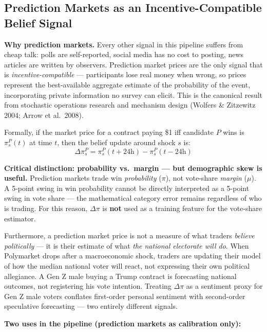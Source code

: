 \documentclass[11pt]{article}
\begin{document}
\subsection*{Prediction Markets as an Incentive-Compatible Belief Signal}

\textbf{Why prediction markets.} Every other signal in this pipeline suffers from
cheap talk: polls are self-reported, social media has no cost to posting, news
articles are written by observers. Prediction market prices are the only signal
that is \emph{incentive-compatible} --- participants lose real money when wrong,
so prices represent the best-available aggregate estimate of the probability of
the event, incorporating private information no survey can elicit. This is the
canonical result from stochastic operations research and mechanism design (Wolfers
\& Zitzewitz 2004; Arrow et al.\ 2008).

Formally, if the market price for a contract paying \$1 iff candidate $P$ wins is
$\pi^{P}_{s}(t)$ at time $t$, then the belief update around shock $s$ is:
\[
  \Delta\pi^{P}_{s} = \pi^{P}_{s}(t + 24\text{h}) - \pi^{P}_{s}(t - 24\text{h})
\]

\begin{mdframed}[style=warnbox]
\textbf{Critical distinction: probability vs.\ margin --- but demographic skew is useful.}
Prediction markets trade win \emph{probability} ($\pi$), not vote-share \emph{margin}
($\mu$). A 5-point swing in win probability cannot be directly interpreted as a 5-point
swing in vote share --- the mathematical category error remains regardless of who is
trading. For this reason, $\Delta\pi$ is \textbf{not} used as a training feature for
the vote-share estimator.

Furthermore, a prediction market price is not a measure of what traders
\emph{believe politically} --- it is their estimate of what \emph{the national
electorate will do}. When Polymarket drops after a macroeconomic shock, traders
are updating their model of how the median national voter will react, not
expressing their own political allegiance. A Gen Z male buying a Trump contract
is forecasting national outcomes, not registering his vote intention. Treating
$\Delta\pi$ as a sentiment proxy for Gen Z male voters conflates
first-order personal sentiment with second-order speculative forecasting ---
two entirely different signals.
\end{mdframed}

\textbf{Two uses in the pipeline (prediction markets as calibration only):}
\end{document}
